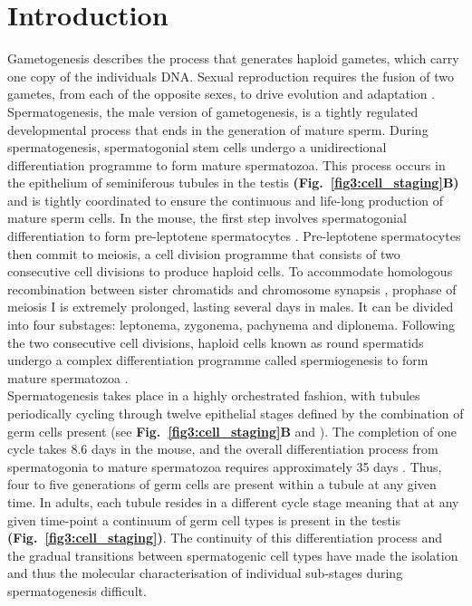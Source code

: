 
\section{Introduction}

Gametogenesis describes the process that generates haploid gametes, which carry one copy of the individuals DNA. Sexual reproduction requires the fusion of two gametes, from each of the opposite sexes, to drive evolution and adaptation \citep{McDonald2016}. Spermatogenesis, the male version of gametogenesis, is a tightly regulated developmental process that ends in the generation of mature sperm. During spermatogenesis, spermatogonial stem cells undergo a unidirectional differentiation programme to form mature spermatozoa. This process occurs in the epithelium of seminiferous tubules in the testis \textbf{(Fig.~\ref{fig3:cell_staging}B)} and is tightly coordinated to ensure the continuous and life-long production of mature sperm cells. In the mouse, the first step involves spermatogonial differentiation to form pre-leptotene spermatocytes \citep{Oakberg1971, DeRooij1973, DeRooij2000}. Pre-leptotene spermatocytes then commit to meiosis, a cell division programme that consists of two consecutive cell divisions to produce haploid cells. To accommodate homologous recombination between sister chromatids and chromosome synapsis \citep{Marston2004}, prophase of meiosis I is extremely prolonged, lasting several days in males. It can be divided into four substages: leptonema, zygonema, pachynema and diplonema. Following the two consecutive cell divisions, haploid cells known as round spermatids undergo a complex differentiation programme called spermiogenesis to form mature spermatozoa \citep{Oakberg1956}. \\

Spermatogenesis takes place in a highly orchestrated fashion, with tubules periodically cycling through twelve epithelial stages defined by the combination of germ cells present (see \textbf{Fig.~\ref{fig3:cell_staging}B} and \citep{Oakberg1956}). The completion of one cycle takes 8.6 days in the mouse, and the overall differentiation process from spermatogonia to mature spermatozoa requires approximately 35 days \citep{Oakberg1956a}. Thus, four to five generations of germ cells are present within a tubule at any given time. In adults, each tubule resides in a different cycle stage meaning that at any given time-point a continuum of germ cell types is present in the testis \textbf{(Fig.~\ref{fig3:cell_staging})}. The continuity of this differentiation process and the gradual transitions between spermatogenic cell types have made the isolation and thus the molecular characterisation of individual sub-stages during spermatogenesis difficult.

